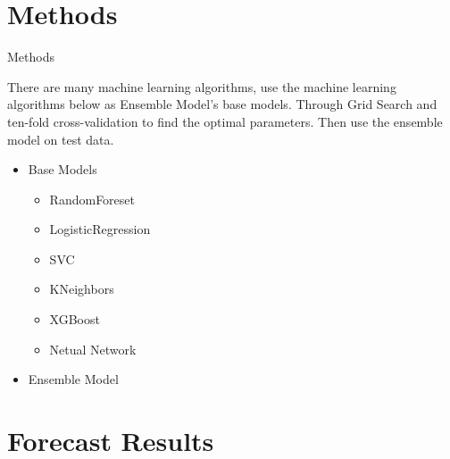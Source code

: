 \documentclass[
 size=14pt,
 paper=smartboard,  %
 mode=present, 		%
 display=slides, 	%
 style=tuliplab,  	%
 pauseslide,
 fleqn,leqno]{powerdot}
\begin{document}

\section{Methods}


\begin{slide}{Methods}

There are many machine learning algorithms, 
use the machine learning algorithms below
as Ensemble Model’s base models. 
Through Grid Search and
ten-fold cross-validation
to find the optimal parameters.
Then use the ensemble model on
test data.

\begin{center}
	\begin{itemize}
		\item Base Models
		\
		\begin{itemize}
			\item RandomForeset
			\item LogisticRegression
			\item SVC
			\item KNeighbors
			\item XGBoost
			\item Netual Network
		\end{itemize}
	    \item Ensemble Model
	\end{itemize}
\end{center}

\end{slide}


\section{Forecast Results}
\end{document}
